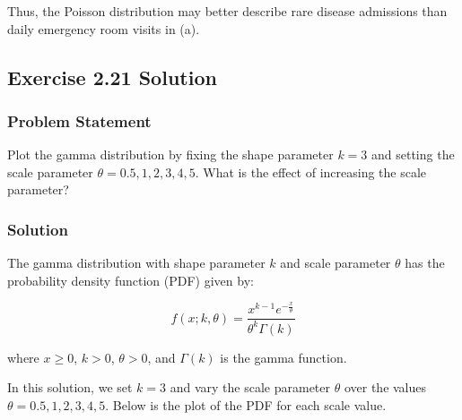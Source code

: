 \documentclass[
]{article}
\begin{document}
Thus, the Poisson distribution may better describe rare disease
admissions than daily emergency room visits in (a).

\hypertarget{exercise-2.21-solution}{%
\subsection{Exercise 2.21 Solution}\label{exercise-2.21-solution}}

\hypertarget{problem-statement-2}{%
\subsubsection{Problem Statement}\label{problem-statement-2}}

Plot the gamma distribution by fixing the shape parameter \(k = 3\) and
setting the scale parameter \(\theta = 0.5, 1, 2, 3, 4, 5\). What is the
effect of increasing the scale parameter?

\hypertarget{solution-2}{%
\subsubsection{Solution}\label{solution-2}}

The gamma distribution with shape parameter \(k\) and scale parameter
\(\theta\) has the probability density function (PDF) given by:

\[
f(x; k, \theta) = \frac{x^{k-1} e^{-\frac{x}{\theta}}}{\theta^k \Gamma(k)}
\]

where \(x \geq 0\), \(k > 0\), \(\theta > 0\), and \(\Gamma(k)\) is the
gamma function.

In this solution, we set \(k = 3\) and vary the scale parameter
\(\theta\) over the values \(\theta = 0.5, 1, 2, 3, 4, 5\). Below is the
plot of the PDF for each scale value.
\end{document}
